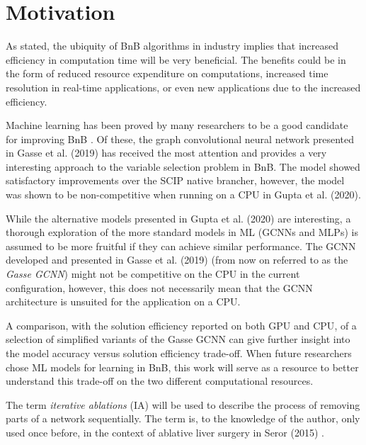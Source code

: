 \section{Motivation}\label{sec:int_motivation}

As stated, the ubiquity of \gls{BnB} algorithms in industry implies that increased efficiency in computation time will be very beneficial. The benefits could be in the form of reduced resource expenditure on computations, increased time resolution in real-time applications, or even new applications due to the increased efficiency.  

Machine learning has been proved by many researchers to be a good candidate for improving \gls{BnB} \cite{khalil2016learning,gasse2019exact,gupta2020hybrid,khalil2020towards,etheve2020reinforcement}. Of these, the graph convolutional neural network presented in Gasse et al. (2019) \cite{gasse2019exact} has received the most attention and provides a very interesting approach to the variable selection problem in \gls{BnB}. The model showed satisfactory improvements over the \gls{SCIP} native brancher, however, the model was shown to be non-competitive when running on a \gls{CPU} in Gupta et al. (2020). 

While the alternative models presented in Gupta et al. (2020) \cite{gupta2020hybrid} are interesting, a thorough exploration of the more standard models in \gls{ML} (\gls{GCNN}s and \gls{MLP}s) is assumed to be more fruitful if they can achieve similar performance. The \gls{GCNN} developed and presented in Gasse et al. (2019) \cite{gasse2019exact} (from now on referred to as the \textit{Gasse \gls{GCNN}}) might not be competitive on the \gls{CPU} in the current configuration, however, this does not necessarily mean that the \gls{GCNN} architecture is unsuited for the application on a \gls{CPU}.

A comparison, with the solution efficiency reported on both \gls{GPU} and \gls{CPU}, of a selection of simplified variants of the Gasse \gls{GCNN} can give further insight into the model accuracy versus solution efficiency trade-off. When future researchers chose \gls{ML} models for learning in \gls{BnB}, this work will serve as a resource to better understand this trade-off on the two different computational resources.

The term \textit{iterative ablations} (\Gls{IA}) will be used to describe the process of removing parts of a network sequentially. The term is, to the knowledge of the author, only used once before, in the context of ablative liver surgery in Seror (2015) \cite{seror2015ablative}. 


